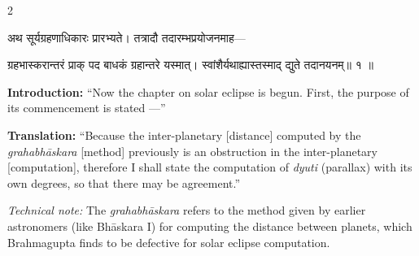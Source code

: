 \documentclass[11pt,a4paper]{article}
\newcommand{\dev}[1]{{\devanagarifont #1}}
\newenvironment{sanskritverse}{%
  \begin{center}\begin{minipage}{0.95\textwidth}
  \setlength{\leftskip}{1em}
  \setlength{\rightskip}{1em}
  \dev
}{\end{minipage}\end{center}}
\begin{document}
\begin{paracol}{2}

\begin{sanskritverse}
अथ सूर्यग्रहणाधिकारः प्रारभ्यते। तत्रादौ तदारम्भप्रयोजनमाह—
\end{sanskritverse}

\begin{sanskritverse}
ग्रहभास्करान्तरं प्राक् पद बाधकं ग्रहान्तरे यस्मात्।
स्वांशैर्यथाह्यास्तस्माद् द्युते तदानयनम्॥ १ ॥
\end{sanskritverse}

\switchcolumn

\textbf{Introduction:} ``Now the chapter on solar eclipse is begun. First, the purpose of its commencement is stated ---''

\textbf{Translation:} ``Because the inter-planetary [distance] computed by the \textit{grahabhāskara} [method] previously is an obstruction in the inter-planetary [computation], therefore I shall state the computation of \textit{dyuti} (parallax) with its own degrees, so that there may be agreement.''

\textit{Technical note:} The \textit{grahabhāskara} refers to the method given by earlier astronomers (like Bhāskara I) for computing the distance between planets, which Brahmagupta finds to be defective for solar eclipse computation.

\end{paracol}

\vspace{0.5em}
\end{document}
